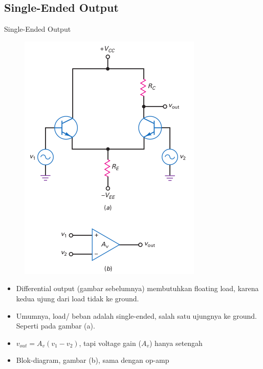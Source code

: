 \documentclass[aspectratio=169]{beamer}
\begin{document}
\subsection{Single-Ended Output}
\begin{frame}{Single-Ended Output}
	\begin{multicols}{2}
		\begin{figure}
			\centering
			\includegraphics[height=0.8\textheight]{gambar/01.diferential_input_single_ended}
		\end{figure}
		\columnbreak
		\begin{itemize}
			\item Differential output (gambar sebelumnya) membutuhkan floating load, karena kedua ujung dari load tidak ke ground.
			\item Umumnya, load/ beban adalah single-ended, salah satu ujungnya ke ground. Seperti pada gambar (a).
			\item $ v_{out} = A_v (v_1 - v_2) $, tapi voltage gain ($ A_v $) hanya setengah
			\item Blok-diagram, gambar (b), sama dengan op-amp
		\end{itemize}
	\end{multicols}
\end{frame}
\end{document}

